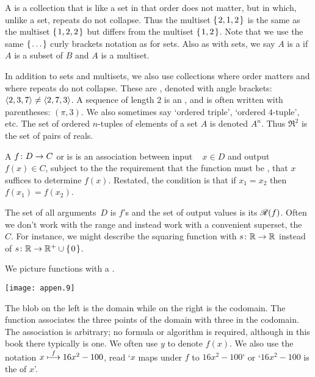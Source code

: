 A 
is a collection that is like a set in that order does not matter,
but in which, unlike a set, repeats do not collapse.
Thus the multiset $\mbox{$\{\hspace{0.1em}2,1,2\hspace{0.1em}\}$}$ is the same as the multiset
$\mbox{$\{\hspace{0.1em}1,2,2\hspace{0.1em}\}$}$  but differs from the multiset
$\mbox{$\{\hspace{0.1em}1,2\hspace{0.1em}\}$}$. 
Note that we use the same $\mbox{$\{\hspace{0.1em}\ldots\hspace{0.1em}\}$}$ 
curly brackets notation as for sets.
Also as with sets, we say $A$ is a  
if $A$ is a subset of $B$ and $A$ is a multiset.



In addition to sets and multisets,
we also use collections where order matters and where repeats do
not collapse.
These are , denoted with angle brackets:
\( \langle 2,3,7\rangle\neq\langle2,7,3\rangle \).
A sequence of length \( 2 \) is an 
,
and is often written with parentheses: \( (\pi,3) \).
We also sometimes say `ordered triple', `ordered \( 4 \)-tuple', etc.
The set of ordered \( n \)-tuples of elements of a set \( A \) is denoted
\( A^n \).
Thus \( \Re^2 \) is the set of pairs of reals.




A  $\mbox{$f\colon D\to C$}$
or  is 
is an association between input \
$x\in D$
and output
$f(x)\in C$, subject to the the requirement 
that the
function must be ,%
\index{well-defined}
that \( x \) suffices to determine \( f(x) \).
Restated, the condition is that
if \( x_1=x_2 \) then \( f(x_1)=f(x_2) \).

The set of all arguments~$D$ is \( f \)'s 
and the set of output values is its 
 $\mathscr{R}(f)$.
Often we don't work with the range and instead
work with a convenient superset, the
~$C$.
For instance, we might describe the squaring function with $\mbox{$s\colon \mathbb{R}\to \mathbb{R}$}$
instead of $\mbox{$s\colon \mathbb{R}\to \mathbb{R}^+\cup \mbox{$\{\hspace{0.1em}0\hspace{0.1em}\}$}$}$.

We picture functions with a 
.
\begin{center}
  \texttt{[image: appen.9]}
\end{center}
The blob on the left is the domain while on the right is the
codomain.
The function associates the three points of the domain with three in the
codomain.
The association is arbitrary; no formula or algorithm is required, although in
this book there typically is one.
We often use $y$ to denote $f(x)$. 
We also use the notation \( x\stackrel{f}{\longmapsto} 16x^2-100 \), read
`\( x \) maps under \( f \) to \( 16x^2-100 \)' or
`\( 16x^2-100 \) is the 
of \( x \)'.

